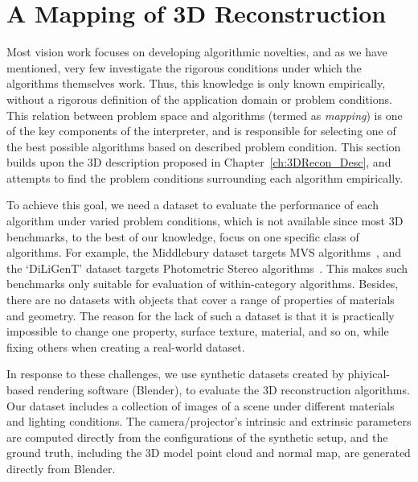 
\chapter{A Mapping of 3D Reconstruction}
\label{ch:3DRecon_Mapping}
Most vision work focuses on developing algorithmic novelties, and as we have mentioned, very few investigate the rigorous conditions under which the algorithms themselves work. Thus, this knowledge is only known empirically, without a rigorous definition of the application domain or problem conditions. This relation between problem space and algorithms (termed as \textit{mapping}) is one of the key components of the interpreter, and is responsible for selecting one of the best possible algorithms based on described problem condition. This section builds upon the 3D description proposed in Chapter~\ref{ch:3DRecon_Desc}, and attempts to find the problem conditions surrounding each algorithm empirically. 

To achieve this goal, we need a dataset to evaluate the performance of each algorithm under varied problem conditions, which is not available since most 3D benchmarks, to the best of our knowledge, focus on one specific class of algorithms. For example, the Middlebury dataset targets MVS algorithms~\cite{seitz2006comparison}, and the `DiLiGenT' dataset targets Photometric Stereo algorithms~\cite{shi2016benchmark}. This makes such benchmarks only suitable for evaluation of within-category algorithms. Besides, there are no datasets with objects that cover a range of properties of materials and geometry. The reason for the lack of such a dataset is that it is practically impossible to change one property, \eg surface texture, material, and so on, while fixing others when creating a real-world dataset.

In response to these challenges, we use synthetic datasets created by phiyical-based rendering software (Blender), to evaluate the 3D reconstruction algorithms. Our dataset includes a collection of images of a scene under different materials and lighting conditions. The camera/projector's intrinsic and extrinsic parameters are computed directly from the configurations of the synthetic setup, and the ground truth, including the 3D model point cloud and normal map, are generated directly from Blender.

